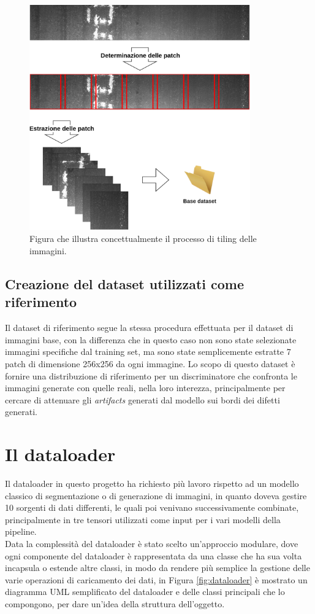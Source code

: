 \begin{figure}[H]
    \centering
    \includegraphics[width=0.85\textwidth]{imgs/Coigan/tilling_op.png}
    \caption{Figura che illustra concettualmente il processo di tiling delle immagini.}
    \label{fig:tiling}
\end{figure}

\subsection{Creazione del dataset utilizzati come riferimento}
Il dataset di riferimento segue la stessa procedura effettuata per il dataset di immagini base, con la differenza che in questo caso
non sono state selezionate immagini specifiche dal training set, ma sono state semplicemente estratte 7 patch di dimensione 256x256 da ogni immagine.
Lo scopo di questo dataset è fornire una distribuzione di riferimento per un discriminatore che confronta le immagini generate con quelle reali,
nella loro interezza, principalmente per cercare di attenuare gli \textit{artifacts} generati dal modello sui bordi dei difetti generati.



\section{Il dataloader}
Il dataloader in questo progetto ha richiesto più lavoro rispetto ad un modello classico di segmentazione o di generazione di immagini,
in quanto doveva gestire 10 sorgenti di dati differenti, le quali poi venivano successivamente combinate, principalmente in tre tensori
utilizzati come input per i vari modelli della pipeline.\\
Data la complessità del dataloader è stato scelto un'approccio modulare, dove ogni componente del dataloader è rappresentata da una classe
che ha sua volta incapsula o estende altre classi, in modo da rendere più semplice la gestione delle varie operazioni di caricamento dei dati,
in Figura \ref{fig:dataloader} è mostrato un diagramma UML semplificato del dataloader e delle classi principali che lo compongono, per dare un'idea
della struttura dell'oggetto.\\

